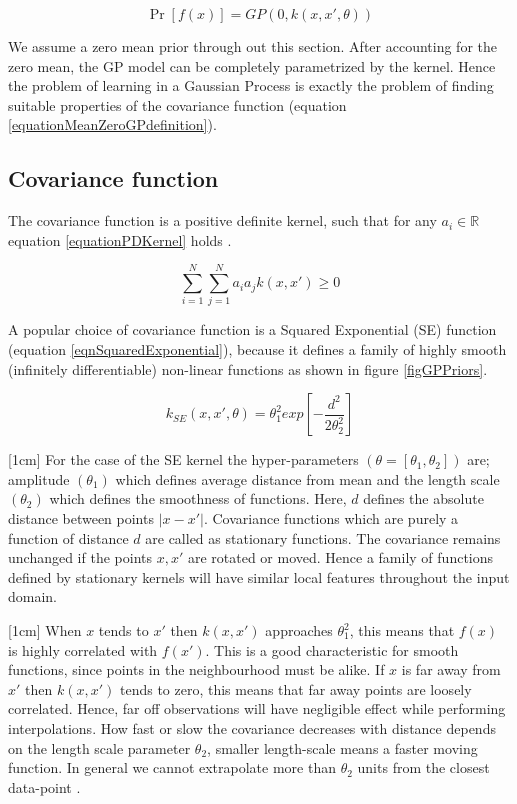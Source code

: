 \begin{equation}\label{equationMeanZeroGPdefinition}
\Pr[f(x)] = GP(0 , k(x, x', \theta))
\end{equation}

We assume a zero mean prior through out this section. After accounting for the zero mean, the GP model can be completely parametrized by the kernel. Hence the problem of learning in a Gaussian Process is exactly the problem of finding suitable properties of the covariance function \cite{rasmussen2006gaussian} (equation \ref{equationMeanZeroGPdefinition}). 


\subsection{Covariance function}\label{subSecCH2Covariance}
The covariance function is a positive definite kernel, such that for any \(a_{i} \in \mathbb{R}\) equation \ref{equationPDKernel} holds \cite{Stein1999Springer}.

\begin{equation}\label{equationPDKernel}
\sum_{i=1}^{N}\sum_{j=1}^{N}a_{i}a_{j}k(x,x') \geq 0
\end{equation}

A popular choice of covariance function is a Squared Exponential (SE) function (equation \ref{eqnSquaredExponential}), because it defines a family of highly smooth (infinitely differentiable) non-linear functions as shown in figure \ref{figGPPriors}.

\begin{equation}\label{eqnSquaredExponential}
k_{SE}(x, x', \theta) = \theta_{1}^2exp[-\frac{d^2}{2\theta_{2}^2}]
\end{equation}

[1cm]
For the case of the SE kernel the hyper-parameters \((\theta = [\theta_{1}, \theta_{2}])\) are; amplitude \((\theta_{1})\) which defines average distance from mean and the length scale \((\theta_{2})\) which defines the smoothness of functions. Here, \(d\) defines the absolute distance between points \(|x-x'|\). Covariance functions which are purely a function of distance \(d\) are called as stationary functions. The covariance remains unchanged if the points \(x, x'\) are rotated or moved. Hence a family of functions defined by stationary kernels will have similar local features throughout the input domain. 

[1cm]
When \(x\) tends to \(x'\) then \(k(x, x')\) approaches \(\theta_{1}^{2}\), this means that \(f(x)\) is highly correlated with \(f(x')\). This is a good characteristic for smooth functions, since points in the neighbourhood must be alike. If \(x\) is far away from  \(x'\) then \(k(x, x')\) tends to zero, this means that far away points are loosely correlated. Hence, far off observations will have negligible effect while performing interpolations. How fast or slow the covariance decreases with distance depends on the length scale parameter \(\theta_{2}\), smaller length-scale means a faster moving function. In general we cannot extrapolate more than \(\theta_{2}\) units from the closest data-point \cite{duvenaud-thesis-2014}. 


